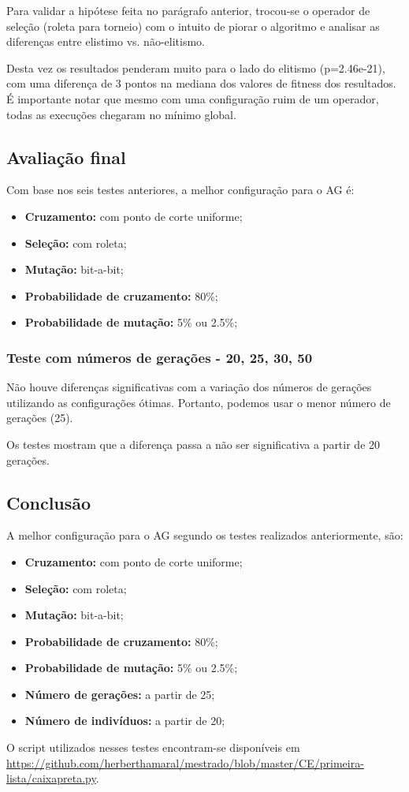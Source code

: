 \documentclass[11pt]{article}
\begin{document}
Para validar a hipótese feita no parágrafo anterior, trocou-se o operador de
seleção (roleta para torneio) com o intuito de piorar o algoritmo e analisar as
diferenças entre elistimo vs. não-elitismo.

Desta vez os resultados penderam muito para o lado do elitismo (p=2.46e-21),
com uma diferença de 3 pontos na mediana dos valores de fitness dos resultados.
É importante notar que mesmo com uma configuração ruim de um operador, todas as
execuções chegaram no mínimo global.

\subsection{Avaliação final}

Com base nos seis testes anteriores, a melhor configuração para o AG é:

\begin{itemize}
    \item \textbf{Cruzamento:} com ponto de corte uniforme;
    \item \textbf{Seleção:} com roleta;
    \item \textbf{Mutação:} bit-a-bit;
    \item \textbf{Probabilidade de cruzamento:} 80\%;
    \item \textbf{Probabilidade de mutação:} 5\% ou 2.5\%;
\end{itemize}

\subsubsection{Teste com números de gerações - 20, 25, 30, 50}

Não houve diferenças significativas com a variação dos números de gerações
utilizando as configurações ótimas. Portanto, podemos usar o menor número de
gerações (25).

Os testes mostram que a diferença passa a não ser significativa a partir de 20 gerações.

\subsection{Conclusão}

A melhor configuração para o AG segundo os testes realizados anteriormente, são:

\begin{itemize}
    \item \textbf{Cruzamento:} com ponto de corte uniforme;
    \item \textbf{Seleção:} com roleta;
    \item \textbf{Mutação:} bit-a-bit;
    \item \textbf{Probabilidade de cruzamento:} 80\%;
    \item \textbf{Probabilidade de mutação:} 5\% ou 2.5\%;
    \item \textbf{Número de gerações:} a partir de 25;
    \item \textbf{Número de indivíduos:} a partir de 20;
\end{itemize}

O script utilizados nesses testes encontram-se disponíveis em \url{https://github.com/herberthamaral/mestrado/blob/master/CE/primeira-lista/caixapreta.py}.
\end{document}
